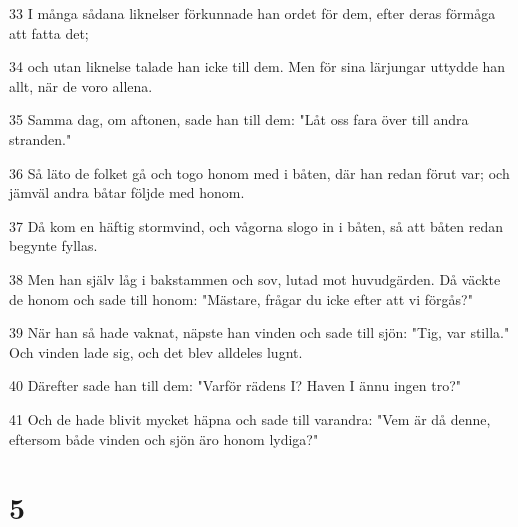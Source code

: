 \par 33 I många sådana liknelser förkunnade han ordet för dem, efter deras förmåga att fatta det;
\par 34 och utan liknelse talade han icke till dem. Men för sina lärjungar uttydde han allt, när de voro allena.
\par 35 Samma dag, om aftonen, sade han till dem: "Låt oss fara över till andra stranden."
\par 36 Så läto de folket gå och togo honom med i båten, där han redan förut var; och jämväl andra båtar följde med honom.
\par 37 Då kom en häftig stormvind, och vågorna slogo in i båten, så att båten redan begynte fyllas.
\par 38 Men han själv låg i bakstammen och sov, lutad mot huvudgärden. Då väckte de honom och sade till honom: "Mästare, frågar du icke efter att vi förgås?"
\par 39 När han så hade vaknat, näpste han vinden och sade till sjön: "Tig, var stilla." Och vinden lade sig, och det blev alldeles lugnt.
\par 40 Därefter sade han till dem: "Varför rädens I? Haven I ännu ingen tro?"
\par 41 Och de hade blivit mycket häpna och sade till varandra: "Vem är då denne, eftersom både vinden och sjön äro honom lydiga?"

\chapter{5}

